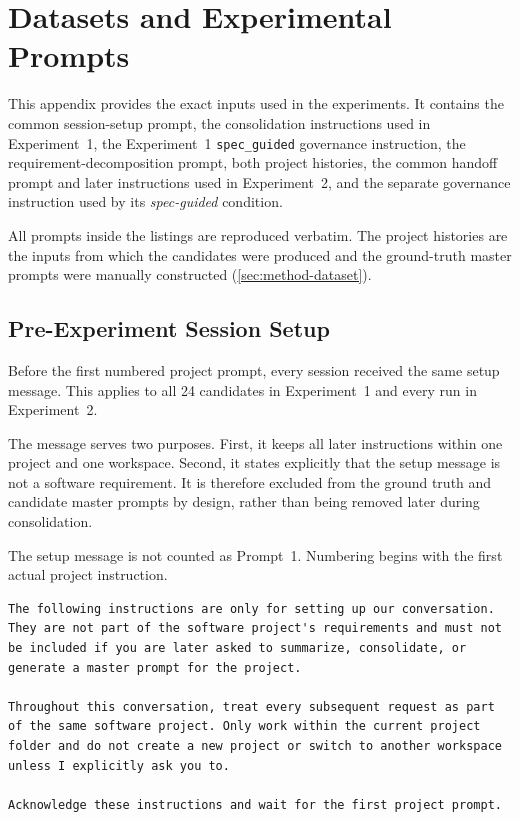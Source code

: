 \chapter{Datasets and Experimental Prompts}
\label{app:datasets}

This appendix provides the exact inputs used in the experiments. It contains
the common session-setup prompt, the consolidation instructions used in
Experiment~1, the Experiment~1 \texttt{spec\_guided} governance instruction,
the requirement-decomposition prompt, both project histories, the common
handoff prompt and later instructions used in Experiment~2, and the separate
governance instruction used by its \emph{spec-guided} condition.

All prompts inside the listings are reproduced verbatim. The project
histories are the inputs from which the candidates were produced and the
ground-truth master prompts were manually constructed
(\cref{sec:method-dataset}).

\section{Pre-Experiment Session Setup}
\label{sec:pre-experiment}

Before the first numbered project prompt, every session received the same
setup message. This applies to all 24 candidates in Experiment~1 and every run
in Experiment~2.

The message serves two purposes. First, it keeps all later instructions within
one project and one workspace. Second, it states explicitly that the setup
message is not a software requirement. It is therefore excluded from the
ground truth and candidate master prompts by design, rather than being removed
later during consolidation.

The setup message is not counted as Prompt~1. Numbering begins with the first
actual project instruction.

\begin{lstlisting}[breaklines=true, basicstyle=\small\ttfamily, caption={Pre-experiment setup prompt, sent once before Prompt 1 of every session.}, label={lst:pre-experiment}]
The following instructions are only for setting up our conversation. They are not part of the software project's requirements and must not be included if you are later asked to summarize, consolidate, or generate a master prompt for the project.

Throughout this conversation, treat every subsequent request as part of the same software project. Only work within the current project folder and do not create a new project or switch to another workspace unless I explicitly ask you to.

Acknowledge these instructions and wait for the first project prompt.
\end{lstlisting}

